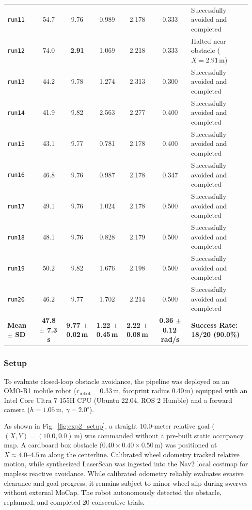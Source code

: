 \documentclass{ieeeaccess}
\begin{document}
\begin{table}[!t]
\begin{tabularx}{\textwidth}{lcccccX}
    \texttt{run11} & 54.7 & 9.76 & 0.989 & 2.178 & 0.333 & Successfully avoided and completed \\
    \texttt{run12} & 74.0 & \textbf{2.91} & 1.069 & 2.218 & 0.333 & Halted near obstacle ($X=2.91$\,m) \\
    \texttt{run13} & 44.2 & 9.78 & 1.274 & 2.313 & 0.300 & Successfully avoided and completed \\
    \texttt{run14} & 41.9 & 9.82 & 2.563 & 2.277 & 0.400 & Successfully avoided and completed \\
    \texttt{run15} & 43.1 & 9.77 & 0.781 & 2.178 & 0.400 & Successfully avoided and completed \\
    \texttt{run16} & 46.8 & 9.76 & 0.987 & 2.178 & 0.347 & Successfully avoided and completed \\
    \texttt{run17} & 49.1 & 9.76 & 1.024 & 2.178 & 0.500 & Successfully avoided and completed \\
    \texttt{run18} & 48.1 & 9.76 & 0.828 & 2.179 & 0.500 & Successfully avoided and completed \\
    \texttt{run19} & 50.2 & 9.82 & 1.676 & 2.198 & 0.500 & Successfully avoided and completed \\
    \texttt{run20} & 46.2 & 9.77 & 1.702 & 2.214 & 0.500 & Successfully avoided and completed \\
    \midrule
    \textbf{Mean $\pm$ SD} & \textbf{47.8 $\pm$ 7.3\,s} & \textbf{9.77 $\pm$ 0.02\,m} & \textbf{1.22 $\pm$ 0.45\,m} & \textbf{2.22 $\pm$ 0.08\,m} & \textbf{0.36 $\pm$ 0.12\,rad/s} & \textbf{Success Rate: 18/20 (90.0\%)} \\
    \bottomrule
  \end{tabularx}
\end{table}

\subsubsection{Setup}
To evaluate closed-loop obstacle avoidance, the pipeline was deployed on an OMO-R1 mobile robot ($r_{\mathrm{robot}} = 0.33$\,m, footprint radius 0.40\,m) equipped with an Intel Core Ultra 7 155H CPU (Ubuntu 22.04, ROS 2 Humble) and a forward camera ($h=1.05$\,m, $\gamma=2.0^\circ$).

As shown in Fig.~\ref{fig:exp2_setup}, a straight 10.0-meter relative goal ($(X, Y) = (10.0, 0.0)$\,m) was commanded without a pre-built static occupancy map. A cardboard box obstacle ($0.40 \times 0.40 \times 0.50$\,m) was positioned at $X \approx 4.0\text{--}4.5$\,m along the centerline. Calibrated wheel odometry tracked relative motion, while synthesized LaserScan was ingested into the Nav2 local costmap for mapless reactive avoidance. While calibrated odometry reliably evaluates evasive clearance and goal progress, it remains subject to minor wheel slip during swerves without external MoCap. The robot autonomously detected the obstacle, replanned, and completed 20 consecutive trials.
\end{document}
